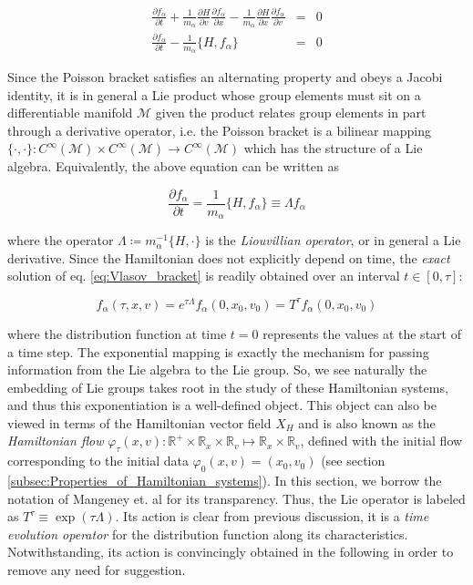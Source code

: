 \documentclass[11pt,titlepage]{report}
\begin{document}
\begin{eqnarray*}
\frac{\partial f_{\alpha}}{\partial t} + \frac{1}{m_{\alpha}}\frac{\partial H}{\partial v}\frac{\partial f_{\alpha}}{\partial x} - \frac{1}{m_{\alpha}}\frac{\partial H}{\partial x}\frac{\partial f_{\alpha}}{\partial v} & = & 0 \\
\frac{\partial f_{\alpha}}{\partial t} - \frac{1}{m_{\alpha}}\{H,f_{\alpha}\} & = & 0
\end{eqnarray*}

\noindent Since the Poisson bracket satisfies an alternating property and obeys a Jacobi identity, it is in general a Lie product whose group elements must sit on a differentiable manifold $\mathcal{M}$ given the product relates group elements in part through a derivative operator, i.e. the Poisson bracket is a bilinear mapping $\{\cdot , \cdot\} \colon C^{\infty}(\mathcal{M}) \times C^{\infty}(\mathcal{M}) \rightarrow C^{\infty}(\mathcal{M})$ which has the structure of a Lie algebra. Equivalently, the above equation can be written as


\begin{equation}\frac{\partial f_{\alpha}}{\partial t} = \frac{1}{m_{\alpha}}\{H,f_{\alpha}\} \equiv \Lambda f_{\alpha}\label{eq:Vlasov_bracket}\end{equation}

\noindent where the operator $\Lambda \coloneqq m_{\alpha}^{-1}\{H,\cdot\}$ is the \emph{Liouvillian operator}, or in general a Lie derivative. Since the Hamiltonian does not explicitly depend on time, the \emph{exact} solution of eq. \eqref{eq:Vlasov_bracket} is readily obtained over an interval $t\in [0,\tau]$:

\begin{equation}f_{\alpha}(\tau,x,v) = e^{\tau \Lambda} f_{\alpha}(0,x_0,v_0) = T^{\tau}f_{\alpha}(0,x_0,v_0) \label{eq:Vlasov_1D1V_exact_soln}\end{equation}

\noindent where the distribution function at time $t = 0$ represents the values at the start of a time step. The exponential mapping is exactly the mechanism for passing information from the Lie algebra to the Lie group.  So, we see naturally the embedding of Lie groups takes root in the study of these Hamiltonian systems, and thus this exponentiation is a well-defined object. This object can also be viewed in terms of the Hamiltonian vector field $X_H$ and is also known as the \emph{Hamiltonian flow} $\varphi_{\tau}(x,v) \colon \mathbb{R}^+ \times \mathbb{R}_x \times \mathbb{R}_v \mapsto \mathbb{R}_x \times \mathbb{R}_v$, defined with the initial flow corresponding to the initial data $\varphi_0(x,v) = (x_0,v_0)$ (see section \ref{subsec:Properties_of_Hamiltonian_systems}). In this section, we borrow the notation of Mangeney et. al \cite{Mangeney02} for its transparency. Thus, the Lie operator is labeled as $T^{\tau} \equiv \exp (\tau \Lambda )$. Its action is clear from previous discussion, it is a \emph{time evolution operator} for the distribution function along its characteristics. Notwithstanding, its action is convincingly obtained in the following in order to remove any need for suggestion.
\end{document}
